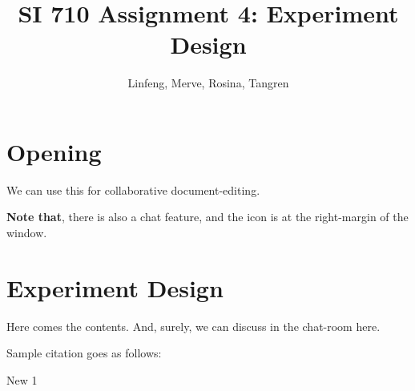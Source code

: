 \documentclass{article}
\title{SI 710 Assignment 4: Experiment Design}
\author{Linfeng, Merve, Rosina, Tangren}
\date{}
\begin{document}
\maketitle

\section{Opening}%

We can use this for collaborative document-editing.

\textbf{Note that}, there is also a chat feature, and the icon is at the right-margin of the window.

\section{Experiment Design}

Here comes the contents. And, surely, we can discuss in the chat-room here.

Sample citation goes as follows: \cite{adams1995hitchhiker}

New 1




\end{document}
